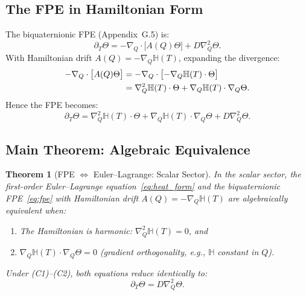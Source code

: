 \documentclass[12pt,a4paper]{article}
\newtheorem{theorem}{Theorem}[section]
\theoremstyle{definition}
\theoremstyle{remark}
\begin{document}
\subsection{The FPE in Hamiltonian Form}
\label{subsec:fpe_hamiltonian}

The biquaternionic FPE (Appendix~G.5) is:
\begin{equation}
  \partial_T\Theta = -\nabla_Q\cdot\bigl[A(Q)\Theta\bigr] + D\nabla_Q^2\Theta.
\label{eq:fpe}
\end{equation}
With Hamiltonian drift $A(Q) = -\nabla_Q\mathbb{H}(T)$, expanding the divergence:
\begin{align}
  -\nabla_Q\cdot\bigl[A(Q)\Theta\bigr]
  &= -\nabla_Q\cdot\bigl[-\nabla_Q\mathbb{H}(T)\cdot\Theta\bigr] \notag\\
  &= \nabla_Q^2\mathbb{H}(T)\cdot\Theta
    + \nabla_Q\mathbb{H}(T)\cdot\nabla_Q\Theta.
\label{eq:fpe_expand}
\end{align}
Hence the FPE becomes:
\begin{equation}
  \partial_T\Theta =
    \nabla_Q^2\mathbb{H}(T)\cdot\Theta
    + \nabla_Q\mathbb{H}(T)\cdot\nabla_Q\Theta
    + D\nabla_Q^2\Theta.
\label{eq:fpe_full}
\end{equation}

\subsection{Main Theorem: Algebraic Equivalence}
\label{subsec:main_theorem}

\begin{theorem}[FPE $\Leftrightarrow$ Euler--Lagrange: Scalar Sector]
\label{thm:fpe_el_equivalence}
In the scalar sector, the first-order Euler--Lagrange equation~\eqref{eq:heat_form}
and the biquaternionic FPE~\eqref{eq:fpe} with Hamiltonian drift
$A(Q) = -\nabla_Q\mathbb{H}(T)$ are algebraically equivalent when:
\begin{enumerate}
  \item[(C1)] The Hamiltonian is harmonic: $\nabla_Q^2\mathbb{H}(T) = 0$, and
  \item[(C2)] $\nabla_Q\mathbb{H}(T)\cdot\nabla_Q\Theta = 0$
              (gradient orthogonality, e.g., $\mathbb{H}$ constant in $Q$).
\end{enumerate}
Under (C1)--(C2), both equations reduce identically to:
\begin{equation}
  \partial_T\Theta = D\nabla_Q^2\Theta.
\label{eq:common_form}
\end{equation}
\end{theorem}
\end{document}
